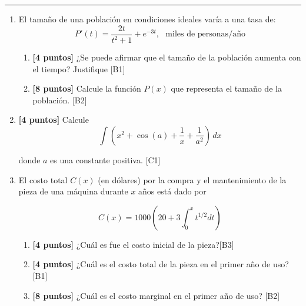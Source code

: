 \documentclass[10pt]{exam}
\begin{document}
\addpoints

\noindent
\rule[2ex]{\textwidth}{2pt}


\begin{enumerate}
\normalsize
\setlength{\columnsep}{10mm}


   \item El tamaño de una población en condiciones ideales varía a una tasa de: $$P'(t)=\frac{2t}{t^2+1}+e^{-3t},\,\,\,\,\text{miles de personas/año}$$
 \begin{enumerate}

    \item \textbf{[4 puntos]} ¿Se puede afirmar que el tamaño de la población aumenta con el tiempo? Justifique \hfill{[B1]}
     \item \textbf{[8 puntos]} Calcule la funci\'on $P(x)$ que representa el tamaño de la poblaci\'on. \hfill{[B2]}
 \end{enumerate}


   \item \textbf{[4 puntos]} Calcule $$\int \left(x^2 + \cos(a)+\dfrac{1}{x}+\dfrac{1}{a^2}\right)\, dx$$ 

donde $a$ es una constante positiva. \hfill{[C1]} 


\item El costo total $C(x)$ (en dólares) por la compra y el mantenimiento de la pieza de una máquina durante $x$ años está dado por

\[C(x)=1000\left(20+3\int_0^x t^{1/2} dt\right)\]


\begin{enumerate}
    \item  \textbf{[4 puntos]} ¿Cuál es fue el costo inicial de la pieza?\hfill{[B3]}
    \item  \textbf{[4 puntos]} ¿Cuál es el costo total de la pieza en el primer año de uso?\hfill{[B1]}
    \item \textbf{[8 puntos]} ¿Cuál es el costo marginal en el primer año de uso? \hfill{[B2]}




\end{enumerate}
\end{enumerate}
\end{document}
